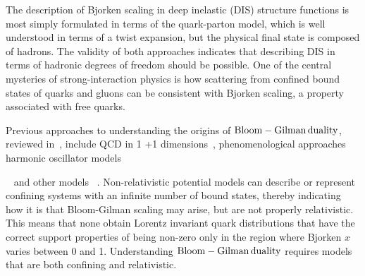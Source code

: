 \documentclass[aps,prd,amsmath,longbibliography]{revtex4-1}
\def\BGs{\rm Bloom-Gilman\,duality}
\begin{document}
The description of Bjorken scaling in deep inelastic (DIS) structure functions is most simply formulated in terms of the quark-parton model, which is well understood in terms of a twist expansion, but the physical final state is composed of hadrons. The validity of both approaches indicates that describing DIS in terms of hadronic degrees of freedom should be possible. One of the central mysteries of strong-interaction physics is how scattering from confined bound states of quarks and gluons can be consistent with Bjorken scaling, a property associated with free quarks.


Previous approaches to understanding the origins of $\BGs$, reviewed in~\cite{Melnitchouk:2005zr}, include QCD in 1 +1 dimensions~\cite{PhysRevD.14.3451}, phenomenological approaches~\cite{Domokos:1971ds,Domokos:1972yc}
harmonic oscillator models{~\cite{Isgur:2001bt,Jeschonnek:2003sb,Close:2002tm,PhysRevC.66.065205}  and other models ~\cite{Close:2001ha,Paris:2001pm,PhysRevC.65.035203}.  Non-relativistic potential models can describe or represent confining systems with an infinite number of bound states, thereby indicating  how it is that Bloom-Gilman scaling may arise, but are not properly relativistic. 
 This means that none 
obtain Lorentz invariant quark distributions that have the correct support properties of being non-zero only in the region where Bjorken $x$ varies between 0 and 1.  Understanding $\BGs$ requires models that are both confining and relativistic.

}
\end{document}
